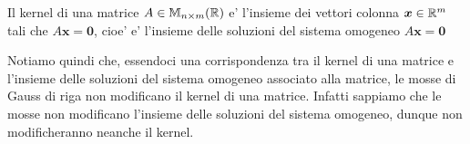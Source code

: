 \begin{remark}
    Il kernel di una matrice $A \in \mathbb{M}_{n \times m}(\mathbb{R})$ e' l'insieme dei vettori colonna $\bm{x} \in \mathbb{R}^m$ tali che $A\bm{x} = \bm{0}$, cioe' e' l'insieme delle soluzioni del sistema omogeneo $A\bm{x}= \bm{0}$ 
\end{remark}

Notiamo quindi che, essendoci una corrispondenza tra il kernel di una matrice e l'insieme delle soluzioni del sistema omogeneo associato alla matrice, le mosse di Gauss di riga non modificano il kernel di una matrice. Infatti sappiamo che le mosse non modificano l'insieme delle soluzioni del sistema omogeneo, dunque non modificheranno neanche il kernel.